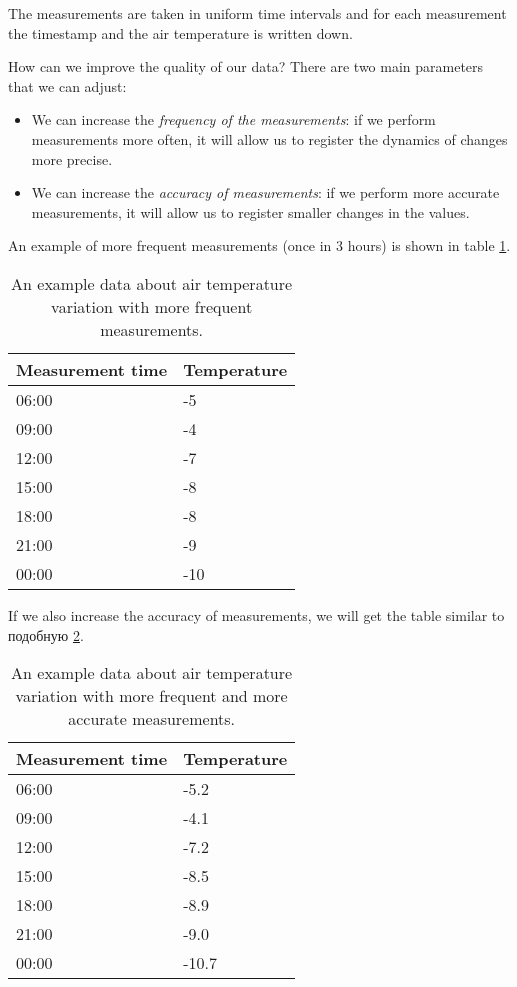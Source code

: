 \documentclass[../sparc.tex]{subfiles}
\begin{document}
The measurements are taken in uniform time intervals and for each measurement
the timestamp and the air temperature is written down.

How can we improve the quality of our data?  There are two main parameters that
we can adjust:

\begin{itemize}
\item We can increase the \emph{frequency of the measurements}: if we perform
  measurements more often, it will allow us to register the dynamics of changes
  more precise.
\item We can increase the \emph{accuracy of measurements}: if we perform more
  accurate measurements, it will allow us to register smaller changes in the
  values.
\end{itemize}

An example of more frequent measurements (once in 3 hours) is shown in table
\ref{table:adc-temperature-data-example-2}.

\begin{table}[h]
  \centering
  \begin{tabular}{p{3cm}|p{4cm}}
    Measurement time & Temperature \\
    \hline \hline
    06:00 & -5 \\
    \hline
    09:00 & -4 \\
    \hline
    12:00 & -7 \\
    \hline
    15:00 & -8 \\
    \hline
    18:00 & -8 \\
    \hline
    21:00 & -9 \\
    \hline
    00:00 & -10 \\
    \hline
  \end{tabular}
  \caption{An example data about air temperature variation with more frequent
    measurements.}
  \label{table:adc-temperature-data-example-2}
\end{table}

If we also increase the accuracy of measurements, we will get the table similar
to подобную \ref{table:adc-temperature-data-example-3}.

\begin{table}[h]
  \centering
  \begin{tabular}{p{3cm}|p{4cm}}
    Measurement time & Temperature \\
    \hline \hline
    06:00 & -5.2 \\
    \hline
    09:00 & -4.1 \\
    \hline
    12:00 & -7.2 \\
    \hline
    15:00 & -8.5 \\
    \hline
    18:00 & -8.9 \\
    \hline
    21:00 & -9.0 \\
    \hline
    00:00 & -10.7 \\
    \hline
  \end{tabular}
  \caption{An example data about air temperature variation with more frequent
    and more accurate measurements.}
  \label{table:adc-temperature-data-example-3}
\end{table}
\end{document}

